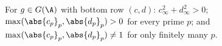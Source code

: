 For $g\in G(\A)$ with bottom row $(c,d)$: $c_\infty^2+d_\infty^2>0$; $\max(\abs{c_p}_p,\abs{d_p}_p)>0$ for every prime $p$; and $\max(\abs{c_p}_p,\abs{d_p}_p)\ne1$ for only finitely many $p$.
